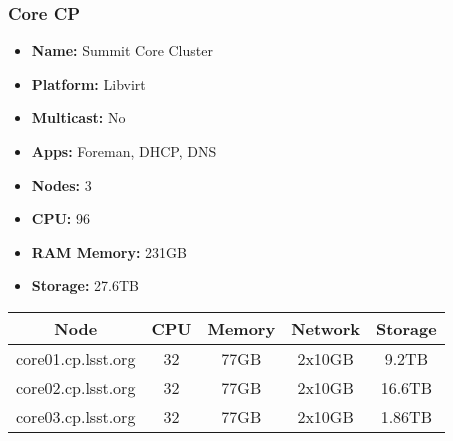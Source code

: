 \newpage
\subsubsection{Core CP}
\begin{itemize}
  \itemsep0em 
  \item \textbf{Name:}       Summit Core Cluster
  \item \textbf{Platform:}   Libvirt
  \item \textbf{Multicast:}  No
  \item \textbf{Apps:}       Foreman, DHCP, DNS
  \item \textbf{Nodes:}      3
  \item \textbf{CPU:}        96
  \item \textbf{RAM Memory:} 231GB
  \item \textbf{Storage:}   27.6TB
\end{itemize}
\begin{center}
  \small
  \begin{tabular}{||c c c c c||}
    \hline
    \textbf{Node} & \textbf{CPU} & \textbf{Memory} & \textbf{Network} & \textbf{Storage} \\ [0.5ex]
    \hline
    core01.cp.lsst.org & 32 & 77GB & 2x10GB & 9.2TB \\
    \hline
    core02.cp.lsst.org & 32 & 77GB & 2x10GB & 16.6TB \\
    \hline
    core03.cp.lsst.org & 32 & 77GB & 2x10GB & 1.86TB \\
    \hline
  \end{tabular}
\end{center}


